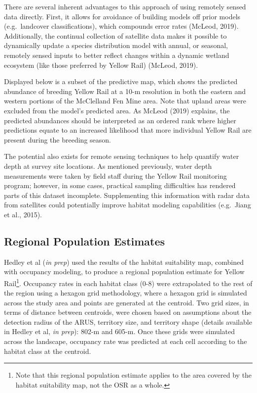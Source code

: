 \documentclass[11pt,]{article}
\begin{document}
There are several inherent advantages to this approach of using remotely
sensed data directly. First, it allows for avoidance of building models
off prior models (e.g.~landcover classifications), which compounds error
rates (McLeod, 2019). Additionally, the continual collection of
satellite data makes it possible to dynamically update a species
distribution model with annual, or seasonal, remotely sensed inputs to
better reflect changes within a dynamic wetland ecosystem (like those
preferred by Yellow Rail) (McLeod, 2019).

Displayed below is a subset of the predictive map, which shows the
predicted abundance of breeding Yellow Rail at a 10-m resolution in both
the eastern and western portions of the McClelland Fen Mine area. Note
that upland areas were excluded from the model's predicted area. As
McLeod (2019) explains, the predicted abundances should be interpreted
as an ordered rank where higher predictions equate to an increased
likelihood that more individual Yellow Rail are present during the
breeding season.

The potential also exists for remote sensing techniques to help quantify
water depth at survey site locations. As mentioned previously, water
depth measurements were taken by field staff during the Yellow Rail
monitoring program; however, in some cases, practical sampling
difficulties has rendered parts of this dataset incomplete.
Supplementing this information with radar data from satellites could
potentially improve habitat modeling capabilities (e.g.~Jiang et al.,
2015).

\subsection{Regional Population
Estimates}\label{regional-population-estimates}

Hedley et al (\emph{in prep}) used the results of the habitat
suitability map, combined with occupancy modeling, to produce a regional
population estimate for Yellow Rail\footnote{Note that this regional
  population estimate applies to the area covered by the habitat
  suitability map, not the OSR as a whole.}. Occupancy rates in each
habitat class (0-8) were extrapolated to the rest of the region using a
hexagon grid methodology, where a hexagon grid is simulated across the
study area and points are generated at the centroid. Two grid sizes, in
terms of distance between centroids, were chosen based on assumptions
about the detection radius of the ARUS, territory size, and territory
shape (details available in Hedley et al, \emph{in prep}): 802-m and
605-m. Once these grids were simulated across the landscape, occupancy
rate was predicted at each cell according to the habitat class at the
centroid.
\end{document}
